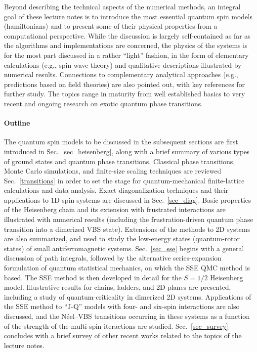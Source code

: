 \documentclass[draft,numberedheadings]{aipproc}
\begin{document}
Beyond describing the technical aspects of the numerical methods, an integral goal of these lecture notes is to introduce the most essential quantum spin 
models (hamiltonians) and to present some of their physical properties from a computational perspective. While the discussion is largely self-contained as far 
as the algorithms and implementations are concerned, the physics of the systems is for the most part discussed in a rather ``light'' fashion, in the form 
of elementary calculations (e.g., spin-wave theory) and qualitative descriptions illustrated by numerical results. Connections to complementary analytical 
approaches (e.g., predictions based on field theories) are also pointed out, with key references for further study. The topics range in maturity from 
well established basics to very recent and ongoing research on exotic quantum phase transitions. 

\paragraph{Outline}

The quantum spin models to be discussed in the subsequent sections are first introduced in Sec.~\ref{sec_heisenberg}, along with a brief summary of various 
types of ground states and quantum phase transitions. Classical phase transitions, Monte Carlo simulations, and finite-size scaling techniques are 
reviewed Sec.~\ref{transitions} in order to set the stage for quantum-mechanical finite-lattice calculations and data analysis. Exact diagonalization 
techniques and their applications to 1D spin systems are discussed in Sec.~\ref{sec_diag}. Basic properties of the Heisenberg chain and its 
extension with frustrated interactions are illustrated with numerical results (including the frustration-driven quantum phase transition into a dimerized 
VBS state). Extensions of the methods to 2D systems are also summarized, and used to study the low-energy states (quantum-rotor states) of small 
antiferromagnetic systems. Sec.~\ref{sec_sse} begins with a general discussion of path integrals, followed by the alternative series-expansion formulation 
of quantum statistical mechanics, on which the SSE QMC method is based. The SSE method is then developed in detail for the $S=1/2$ Heisenberg model. Illustrative 
results for chains, ladders, and 2D planes are presented, including a study of quantum-criticality in dimerized 2D systems. Applications of the SSE method to 
``J-Q'' models with four- and six-spin interactions are also discussed, and the N\'eel--VBS transitions occurring in these systems as a function of the
strength of the multi-spin iteractions are studied. Sec.~\ref{sec_survey} concludes with a brief survey of other recent works related to the topics of the 
lecture notes. 
\end{document}
